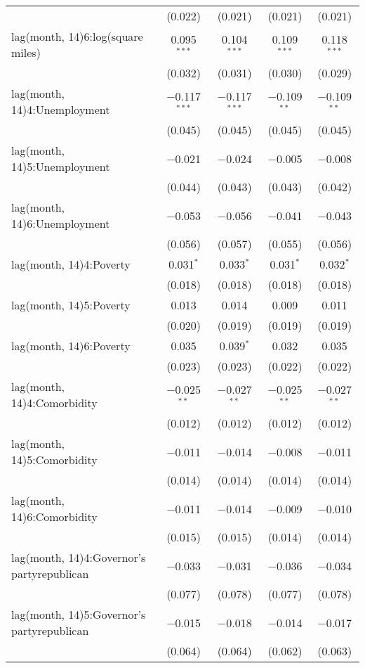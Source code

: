 \begin{tabular}{@{\extracolsep{1pt}}lcccc}
  & (0.022) & (0.021) & (0.021) & (0.021) \\ 
  lag(month, 14)6:log(square miles) & 0.095$^{***}$ & 0.104$^{***}$ & 0.109$^{***}$ & 0.118$^{***}$ \\ 
  & (0.032) & (0.031) & (0.030) & (0.029) \\ 
  lag(month, 14)4:Unemployment & $-$0.117$^{***}$ & $-$0.117$^{***}$ & $-$0.109$^{**}$ & $-$0.109$^{**}$ \\ 
  & (0.045) & (0.045) & (0.045) & (0.045) \\ 
  lag(month, 14)5:Unemployment & $-$0.021 & $-$0.024 & $-$0.005 & $-$0.008 \\ 
  & (0.044) & (0.043) & (0.043) & (0.042) \\ 
  lag(month, 14)6:Unemployment & $-$0.053 & $-$0.056 & $-$0.041 & $-$0.043 \\ 
  & (0.056) & (0.057) & (0.055) & (0.056) \\ 
  lag(month, 14)4:Poverty & 0.031$^{*}$ & 0.033$^{*}$ & 0.031$^{*}$ & 0.032$^{*}$ \\ 
  & (0.018) & (0.018) & (0.018) & (0.018) \\ 
  lag(month, 14)5:Poverty & 0.013 & 0.014 & 0.009 & 0.011 \\ 
  & (0.020) & (0.019) & (0.019) & (0.019) \\ 
  lag(month, 14)6:Poverty & 0.035 & 0.039$^{*}$ & 0.032 & 0.035 \\ 
  & (0.023) & (0.023) & (0.022) & (0.022) \\ 
  lag(month, 14)4:Comorbidity & $-$0.025$^{**}$ & $-$0.027$^{**}$ & $-$0.025$^{**}$ & $-$0.027$^{**}$ \\ 
  & (0.012) & (0.012) & (0.012) & (0.012) \\ 
  lag(month, 14)5:Comorbidity & $-$0.011 & $-$0.014 & $-$0.008 & $-$0.011 \\ 
  & (0.014) & (0.014) & (0.014) & (0.014) \\ 
  lag(month, 14)6:Comorbidity & $-$0.011 & $-$0.014 & $-$0.009 & $-$0.010 \\ 
  & (0.015) & (0.015) & (0.014) & (0.014) \\ 
  lag(month, 14)4:Governor's partyrepublican & $-$0.033 & $-$0.031 & $-$0.036 & $-$0.034 \\ 
  & (0.077) & (0.078) & (0.077) & (0.078) \\ 
  lag(month, 14)5:Governor's partyrepublican & $-$0.015 & $-$0.018 & $-$0.014 & $-$0.017 \\ 
  & (0.064) & (0.064) & (0.062) & (0.063) \\ 

\end{tabular}
